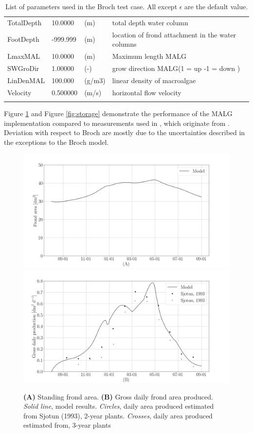 \documentclass{deltares_manual}
\begin{document}
\begin{longtable}{|l|l|l|l|}
	TotalDepth & 10.0000 & (m) & total depth water column\\ 
	FootDepth & -999.999 & (m) & location of frond attachment in the water columns\\ 
	LmaxMAL & 10.0000 & (m) & Maximum length MALG\\ 
	SWGroDir & 1.00000 & (-) & grow direction MALG(1 = up -1 = down )\\ 
	LinDenMAL & 100.000 & (g/m3) & linear density of macroalgae\\ 
	Velocity & 0.500000 & (m/s) & horizontal flow velocity\\ 
	\hline
	\caption{List of parameters used in the Broch test case. All except $\epsilon$ are the default value.}
	\label{tab:parameters}
\end{longtable}

Figure \ref{fig:biomass} and Figure \ref{fig:storage} demonstrate the performance of the MALG implementation compared to measurements used in \cite{broch2012}, which originate from \cite{sjotun1993}. Deviation with respect to Broch are mostly due to the uncertainties described in the exceptions to the Broch model.

\begin{figure}[H]
	\centering
	\includegraphics[width=1\linewidth]{figures/frond_area}
	\includegraphics[width=1\linewidth]{figures/production}
	\caption{\textbf{(A)} Standing frond area. \textbf{(B)} Gross daily frond area produced. \textit{Solid line}, model results. \textit{Circles}, daily area produced estimated from Sjotun (1993), 2-year plants. \textit{Crosses}, daily area produced estimated from\cite{sjotun1993}, 3-year plants}
	\label{fig:biomass}
\end{figure}
\end{document}
